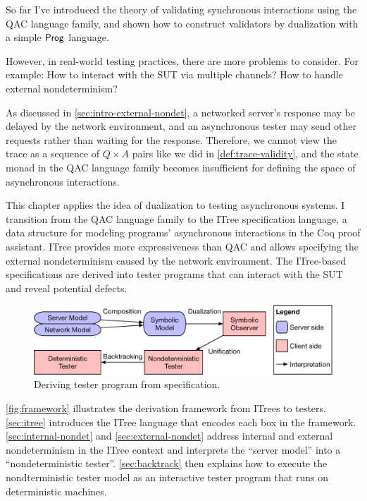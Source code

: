 So far I've introduced the theory of validating synchronous interactions using
the QAC language family, and shown how to construct validators by dualization
with a simple $\mathsf{Prog}$ language.

However, in real-world testing practices, there are more problems to consider.
For example: How to interact with the SUT via multiple channels?  How to handle
external nondeterminism?

As discussed in \autoref{sec:intro-external-nondet}, a networked server's
response may be delayed by the network environment, and an asynchronous tester
may send other requests rather than waiting for the response.  Therefore, we
cannot view the trace as a sequence of $Q\times A$ pairs like we did
in \autoref{def:trace-validity}, and the state monad in the QAC language family
becomes insufficient for defining the space of asynchronous interactions.

This chapter applies the idea of dualization to testing asynchronous systems.  I
transition from the QAC language family to the ITree specification language, a
data structure for modeling programs' asynchronous interactions in the Coq
proof assistant.  ITree provides more expressiveness than QAC and allows
specifying the external nondeterminism caused by the network environment.  The
ITree-based specifications are derived into tester programs that can interact
with the SUT and reveal potential defects.

\begin{figure}[t]
  \includegraphics[width=\linewidth]{figures/framework}
  \caption{Deriving tester program from specification.}
  \label{fig:framework}
\end{figure}

\autoref{fig:framework} illustrates the derivation framework from ITrees to
testers.  \autoref{sec:itree} introduces the ITree language that encodes each
box in the framework.  \autoref{sec:internal-nondet} and
\autoref{sec:external-nondet} address internal and external nondeterminism in
the ITree context and interprets the ``server model'' into a ``nondeterministic
tester''.  \autoref{sec:backtrack} then explains how to execute the
nondterministic tester model as an interactive tester program that runs on
deterministic machines.

